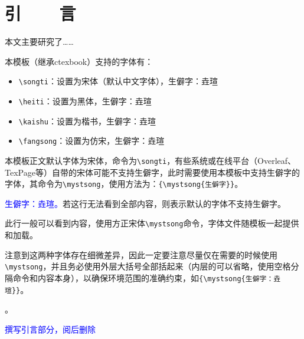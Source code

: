 
\chapter{引~~~~言}
本文主要研究了……

本模板（继承ctexbook）支持的字体有：
\begin{itemize}
  \item \verb|\songti|{\songti ：设置为宋体（默认中文字体），生僻字：垚瑄}
  \item \verb|\heiti|{\heiti ：设置为黑体，生僻字：垚瑄}
  \item \verb|\kaishu|{\kaishu ：设置为楷书，生僻字：垚瑄}
  \item \verb|\fangsong|{\fangsong ：设置为仿宋，生僻字：垚瑄}
\end{itemize}

本模板正文默认字体为宋体，命令为\verb|\songti|，有些系统或在线平台（Overleaf、TexPage等）自带的宋体可能不支持生僻字，此时需要使用本模板中支持生僻字的字体{}，其命令为\verb|\mystsong|，使用方法为：\verb|{\mystsong{生僻字}}|。

\textcolor{blue}{生僻字：垚瑄。}若这行无法看到全部内容，则表示默认的字体不支持生僻字。

\textcolor{blue}{}此行一般可以看到内容，使用方正宋体\verb|\mystsong|命令，字体文件随模板一起提供和加载。

注意到这两种字体存在细微差异，因此一定要注意尽量仅在需要的时候使用\verb|\mystsong|，并且务必使用外层大括号全部括起来（内层的可以省略，使用空格分隔命令和内容本身），以确保环境范围的准确约束，如\verb|{\mystsong{生僻字：垚瑄}}|。

{}。


\textcolor{blue}{撰写引言部分，阅后删除}